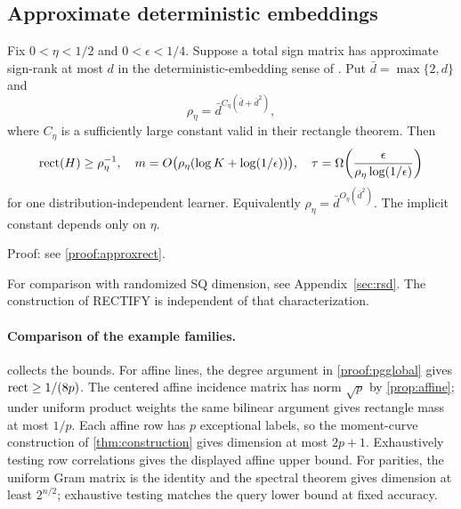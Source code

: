 \subsection{Approximate deterministic embeddings}
\begin{corollary}\label{cor:approxrect}
Fix $0<\eta<1/2$ and $0<\epsilon<1/4$. Suppose a total sign matrix has approximate sign-rank at most $d$ in the deterministic-embedding sense of \citet{BHKR26}. Put $\bar d=\max\{2,d\}$ and
\[
 \rho_\eta=\bar d^{C_\eta(\bar d+\bar d^2)},
\]
where $C_\eta$ is a sufficiently large constant valid in their rectangle theorem. Then
\[
 \operatorname{rect}(H)\ge\rho_\eta^{-1},\quad
 m=O\bigl(\rho_\eta(\log K+\log(1/\epsilon))\bigr),\quad
 \tau=\Omega\!\left(\frac{\epsilon}{\rho_\eta\log(1/\epsilon)}\right)
\]
for one distribution-independent learner. Equivalently $\rho_\eta=\bar d^{O_\eta(\bar d^2)}$. The implicit constant depends only on $\eta$.
\end{corollary}

\noindent Proof: see \cref{proof:approxrect}.\par
For comparison with randomized SQ dimension, see Appendix~\ref{sec:rsd}. The construction of RECTIFY is independent of that characterization.

\paragraph{Comparison of the example families.}
 collects the bounds. For affine lines, the degree argument in \cref{proof:pgglobal} gives $\operatorname{rect}\ge1/(8p)$. The centered affine incidence matrix has norm $\sqrt p$ by \cref{prop:affine}; under uniform product weights the same bilinear argument gives rectangle mass at most $1/p$. Each affine row has $p$ exceptional labels, so the moment-curve construction of \cref{thm:construction} gives dimension at most $2p+1$. Exhaustively testing row correlations gives the displayed affine upper bound. For parities, the uniform Gram matrix is the identity and the spectral theorem gives dimension at least $2^{n/2}$; exhaustive testing matches the query lower bound at fixed accuracy.


